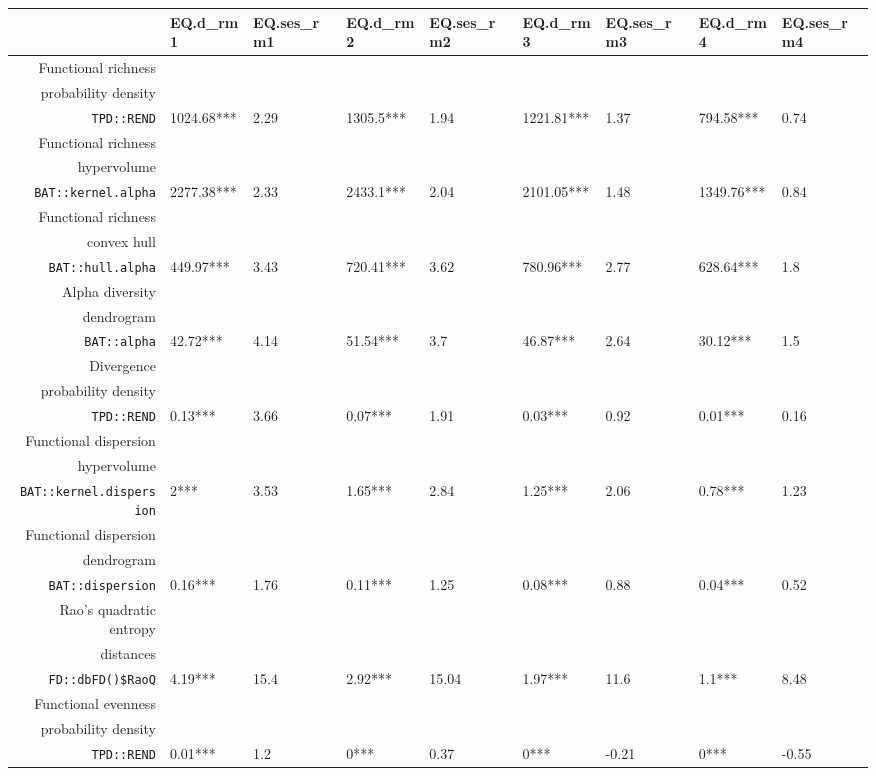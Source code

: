 \begin{table}[ht]
\centering
\scriptsize
\begin{tabular}{rllllllll}
  \hline
 & EQ.d\_rm1 & EQ.ses\_rm1 & EQ.d\_rm2 & EQ.ses\_rm2 & EQ.d\_rm3 & EQ.ses\_rm3 & EQ.d\_rm4 & EQ.ses\_rm4 \\ 
  \hline
Functional richness\\ probability density\\ \texttt{TPD::REND} & 1024.68*** & 2.29 & 1305.5*** & 1.94 & 1221.81*** & 1.37 & 794.58*** & 0.74 \\ 
  Functional richness\\ hypervolume\\ \texttt{BAT::kernel.alpha} & 2277.38*** & 2.33 & 2433.1*** & 2.04 & 2101.05*** & 1.48 & 1349.76*** & 0.84 \\ 
  Functional richness\\ convex hull\\ \texttt{BAT::hull.alpha} & 449.97*** & 3.43 & 720.41*** & 3.62 & 780.96*** & 2.77 & 628.64*** & 1.8 \\ 
  Alpha diversity\\ dendrogram\\ \texttt{BAT::alpha} & 42.72*** & 4.14 & 51.54*** & 3.7 & 46.87*** & 2.64 & 30.12*** & 1.5 \\ 
  Divergence\\ probability density\\ \texttt{TPD::REND} & 0.13*** & 3.66 & 0.07*** & 1.91 & 0.03*** & 0.92 & 0.01*** & 0.16 \\ 
  Functional dispersion\\ hypervolume\\ \texttt{BAT::kernel.dispersion} & 2*** & 3.53 & 1.65*** & 2.84 & 1.25*** & 2.06 & 0.78*** & 1.23 \\ 
  Functional dispersion\\ dendrogram\\ \texttt{BAT::dispersion} & 0.16*** & 1.76 & 0.11*** & 1.25 & 0.08*** & 0.88 & 0.04*** & 0.52 \\ 
  Rao's quadratic entropy\\ distances\\ \texttt{FD::dbFD()\$RaoQ} & 4.19*** & 15.4 & 2.92*** & 15.04 & 1.97*** & 11.6 & 1.1*** & 8.48 \\ 
  Functional evenness\\ probability density\\ \texttt{TPD::REND} & 0.01*** & 1.2 & 0*** & 0.37 & 0*** & -0.21 & 0*** & -0.55 \\ 

\end{tabular}
\end{table}
